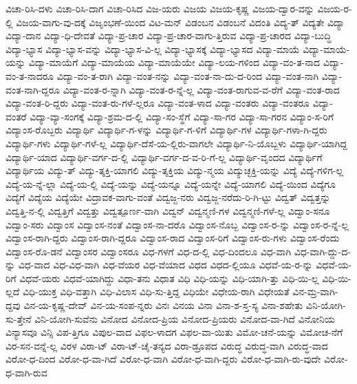 {ವಿಚಾ-ರಿಸಿ-ದಳು
ವಿಚಾ-ರಿಸಿ-ದಾಗ
ವಿಚಾ-ರಿಸಿದ
ವಿಜ-ಯರು
ವಿಜಯ
ವಿಜಯ-ಕೃಷ್ಣ
ವಿಜಯ-ದ್ವಾರ-ವನ್ನು
ವಿಜಯ-ರ-ಲ್ಲಿ
ವಿಜಯ-ವಾಗು-ವು-ದಕ್ಕೆ
ವಿಜೃಂಭಣೆ-ಯಿಂದ
ವಿಟ-ಮನ್
ವಿಡಂಬನ
ವಿಡಂಬನೆ
ವಿದಂತಿ
ವಿದ್ಯ-ತ್
ವಿದ್ಯತೇ
ವಿದ್ಯಾ
ವಿದ್ಯಾ-ದಾನ
ವಿದ್ಯಾ-ಧಿ-ದೇವತೆ
ವಿದ್ಯಾ-ಪ್ರ-ಚಾರ
ವಿದ್ಯಾ-ಪ್ರ-ಚಾರ-ವಾಗು-ತ್ತಿರುವ
ವಿದ್ಯಾ-ಪ್ರ-ಚಾರದ
ವಿದ್ಯಾ-ಬುದ್ಧಿ
ವಿದ್ಯಾ-ಭ್ಯಾಸ
ವಿದ್ಯಾ-ಭ್ಯಾಸ-ವನ್ನು
ವಿದ್ಯಾ-ಭ್ಯಾಸ-ವಿ-ಲ್ಲ
ವಿದ್ಯಾ-ಭ್ಯಾಸಕ್ಕೆ
ವಿದ್ಯಾ-ಭ್ಯಾಸದ
ವಿದ್ಯಾ-ಮಾಯೆ
ವಿದ್ಯಾ-ಮಾಯೆ-ಯನ್ನು
ವಿದ್ಯಾ-ಮಾಯೆಗೆ
ವಿದ್ಯಾ-ಮಾಯೆಯ
ವಿದ್ಯಾ-ಮಾಯೆಯೇ
ವಿದ್ಯಾ-ಲಯ-ಗಳಿಂದ
ವಿದ್ಯಾ-ವಂ-ತ-ನಾದ
ವಿದ್ಯಾ-ವಂ-ತ-ನಾದರೂ
ವಿದ್ಯಾ-ವಂ-ತ-ರಾಗಿ
ವಿದ್ಯಾ-ವಂತ-ನನ್ನು
ವಿದ್ಯಾ-ವಂತ-ನಾ-ದು-ದ-ರಿಂದ
ವಿದ್ಯಾ-ವಂತ-ನಾಗಿ
ವಿದ್ಯಾ-ವಂತ-ನಾಗಿ-ದ್ದರೂ
ವಿದ್ಯಾ-ವಂತ-ರ-ನ್ನಾಗಿ
ವಿದ್ಯಾ-ವಂತ-ರ-ನ್ನೆ-ಲ್ಲ
ವಿದ್ಯಾ-ವಂತ-ರಾಗುವ-ವ-ರೆಗೆ
ವಿದ್ಯಾ-ವಂತ-ರಾದ
ವಿದ್ಯಾ-ವಂತ-ರಿ-ದ್ದರು
ವಿದ್ಯಾ-ವಂತ-ರು-ಗಳೆ-ಲ್ಲರೂ
ವಿದ್ಯಾ-ವಂತ-ಳಾದ
ವಿದ್ಯಾ-ವಂತರು
ವಿದ್ಯಾ-ವಂತರೂ
ವಿದ್ಯಾ-ವಂತರೆ
ವಿದ್ಯಾ-ವ್ಯಾ-ಸಂಗಕ್ಕೆ
ವಿದ್ಯಾ-ಶ್ರಮ-ದ-ಲ್ಲಿ
ವಿದ್ಯಾ-ಸಂ-ಸ್ಥೆಗೆ
ವಿದ್ಯಾ-ಸಾ-ಗರ
ವಿದ್ಯಾ-ಸಾ-ಗರನ
ವಿದ್ಯಾಂ-ಸ-ರಿಗೆ
ವಿದ್ಯಾಂಸ-ರೊಬ್ಬರು
ವಿದ್ಯಾರ್ಥಿ
ವಿದ್ಯಾರ್ಥಿ-ಗ-ಳನ್ನು
ವಿದ್ಯಾರ್ಥಿ-ಗ-ಳಿಗೆ
ವಿದ್ಯಾರ್ಥಿ-ಗಳ
ವಿದ್ಯಾರ್ಥಿ-ಗಳಾ-ಗಿ-ದ್ದರು
ವಿದ್ಯಾರ್ಥಿ-ಗಳು
ವಿದ್ಯಾರ್ಥಿ-ಗಳೆ-ಲ್ಲ
ವಿದ್ಯಾರ್ಥಿ-ದೆಸೆ-ಯ-ಲ್ಲಿರು-ವಾಗಲೇ
ವಿದ್ಯಾರ್ಥಿ-ನಿ-ಯೊಬ್ಬಳು
ವಿದ್ಯಾರ್ಥಿ-ಯಾಗಿದ್ದ
ವಿದ್ಯಾರ್ಥಿ-ಯಾದ
ವಿದ್ಯಾರ್ಥಿ-ವರ್ಗ-ದ-ಲ್ಲಿ
ವಿದ್ಯಾರ್ಥಿ-ವರ್ಗ-ದ-ವ-ರಿ-ಗೆ-ಲ್ಲ
ವಿದ್ಯಾರ್ಥಿ-ವೃಂದದ
ವಿದ್ಯಾರ್ಥಿಗೆ
ವಿದ್ಯಾರ್ಥಿಯ
ವಿದ್ಯು-ತ್
ವಿದ್ಯು-ತ್ಶಕ್ತಿ-ಯಾಗಲಿ
ವಿದ್ಯು-ತ್ಶಕ್ತಿಯ
ವಿದ್ಯು-ನ್ಮಯ
ವಿದ್ಯುಚ್ಛಕ್ತಿ-ಯನ್ನು
ವಿದ್ಯೆ
ವಿದ್ಯೆ-ಗಳಿಗ-ಲ್ಲ
ವಿದ್ಯೆ-ಯ-ನ್ನೆ-ಲ್ಲಾ
ವಿದ್ಯೆ-ಯ-ಲ್ಲಿ
ವಿದ್ಯೆ-ಯನ್ನು
ವಿದ್ಯೆ-ಯನ್ನೂ
ವಿದ್ಯೆ-ಯನ್ನೇ
ವಿದ್ಯೆ-ಯಾಗಲಿ
ವಿದ್ಯೆ-ಯಿಂದ
ವಿದ್ಯೆಗೂ
ವಿದ್ಯೆಗೆ
ವಿದ್ಯೆಯ
ವಿದ್ಯೆಯೇ
ವಿದ್ರಾವಕ-ವಾಗು-ವಂತೆ
ವಿದ್ವಜ್ಜ-ನರು
ವಿದ್ವಜ್ಜ-ನರೆದು-ರಿ-ಗಿ-ಟ್ಟು
ವಿದ್ವತ್
ವಿದ್ವತ್ತನ್ನು
ವಿದ್ವತ್ತಿ-ನ-ಲ್ಲಿ
ವಿದ್ವತ್ತಿಗೆ
ವಿದ್ವತ್ತು
ವಿದ್ವತ್ಪೂರ್ಣ-ವಾಗಿ
ವಿದ್ವನ್
ವಿದ್ವನ್ಮಣಿ-ಗಳ
ವಿದ್ವನ್ಮಣಿ-ಗಳೆ-ಲ್ಲ
ವಿದ್ವಾಂ-ಸನೂ
ವಿದ್ವಾಂ-ಸರು
ವಿದ್ವಾಂಸ
ವಿದ್ವಾಂಸ-ನಂತೆ
ವಿದ್ವಾಂಸ-ನಾ-ದರೊ
ವಿದ್ವಾಂಸ-ನೊಬ್ಬ
ವಿದ್ವಾಂಸ-ರ-ನ್ನು
ವಿದ್ವಾಂಸ-ರ-ನ್ನೆ-ಲ್ಲ
ವಿದ್ವಾಂಸ-ರಾಗಿ-ದ್ದರು
ವಿದ್ವಾಂಸ-ರಾಗಿ-ದ್ದರೂ
ವಿದ್ವಾಂಸ-ರಾದ
ವಿದ್ವಾಂಸ-ರಿಗೆ
ವಿದ್ವಾಂಸ-ರು-ಗಳು
ವಿದ್ವಾಂಸ-ರೆಂದು
ವಿದ್ವಾಂಸ-ರೊ-ಡನೆ
ವಿದ್ವಾಂಸರ
ವಿದ್ವಾಂಸರೂ
ವಿಧ-ಗಳಗೆ
ವಿಧ-ದ-ಲ್ಲಿ
ವಿಧ-ದಿಂದಲೂ
ವಿಧ-ವಾಗಿ
ವಿಧ-ವಾಗಿ-ದ್ದು-ದ-ನ್ನು
ವಿಧ-ವಾದ
ವಿಧ-ವಿಧ-ವಾಗಿ
ವಿಧ-ವೆಯರ
ವಿಧ-ವೆಯಾದ
ವಿಧದ
ವಿಧದ-ಲ್ಲಿಯೂ
ವಿಧವೆ-ಯ-ರ-ನ್ನು
ವಿಧವೆ-ಯ-ರಿಗೆ
ವಿಧವೆ-ಯರು
ವಿಧವೆ-ಯಾಗಿದ್ದು
ವಿಧಾ-ತನು
ವಿಧಾತ
ವಿಧಿ
ವಿಧಿ-ಯನ್ನು
ವಿಧಿ-ಯಾಗಿ-ತ್ತು
ವಿಧಿ-ಯಿ-ಲ್ಲ
ವಿಧಿ-ಯಿ-ಲ್ಲದೆ
ವಿಧಿ-ಯುಕ್ತ
ವಿಧಿ-ವತ್ತಾಗಿ
ವಿಧಿ-ವಿಲಾಸ
ವಿಧಿ-ಸು-ತ್ತಿದ್ದ
ವಿಧಿಯೇ
ವಿಧೇಯ-ರಾಗಿ
ವಿಧೇಯತೆ
ವಿನ-ಮ್ರ-ವಾಗಿ-ದ್ದವು
ವಿನ-ಯ-ಕೃಷ್ಣ-ದೇವ್
ವಿನ-ಯ-ಸಂಪ-ನ್ನರು
ವಿನಃ
ವಿನಯ
ವಿನಾ
ವಿನಾ-ಶ-ಸ್ತ-ಸ್ಯ
ವಿನಾ-ಶಹೇತು
ವಿನಿ-ಯೋಗಿ-ಸು-ತ್ತೇನೆ
ವಿನಿ-ಯೋಗಿ-ಸುವೆನು
ವಿನೋದ
ವಿನೋದ-ಪ್ರಿಯ
ವಿನೋದ-ಪ್ರಿಯರು
ವಿನೋದ-ವಾ-ಗಿದೆ
ವಿನೋನಿಯ
ವಿನ್ಯಾಸವೂ
ವಿನ್ಸಿ
ವಿಪ-ತ್ತಿಗೂ
ವಿಪುಲ-ವಾದ
ವಿಫಲ-ಳಾದಗ
ವಿಫಲ-ವಾ-ಯಿತು
ವಿಮೋ-ಚನೆ-ಯನ್ನು
ವಿಮೋಚ-ನೆಗೆ
ವಿರ-ಸನ-ವನ್ನೆ-ಲ್ಲ
ವಿರಳ
ವಿರಾ-ಟ್
ವಿರಾ-ಟ್-ಚೈ-ತನ್ಯದ
ವಿರಾ-ಡ್ರೂಪದ
ವಿರುದ್ಧ
ವಿರುದ್ಧ-ವಾಗಿ
ವಿರುದ್ಧ-ವಾದ
ವಿರೋ-ಧ-ದಿಂದ
ವಿರೋ-ಧ-ವಾ-ಗಿದೆ
ವಿರೋ-ಧ-ವಾಗಿ
ವಿರೋ-ಧ-ವಾಗಿ-ದ್ದರು
ವಿರೋ-ಧ-ವಾಗಿ-ರು-ವುದೇ
ವಿರೋ-ಧ-ವಾಗಿ-ರುವ
}
